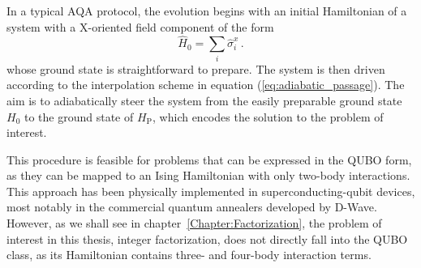In a typical AQA protocol, the evolution begins with an initial Hamiltonian of a system with a X-oriented field component of the form
\begin{equation}
    \hat{H}_0 = \sum_i \hat{\sigma}_i^x\,.
    \label{eq:transverse_field_hamiltonian}
\end{equation}
whose ground state is straightforward to prepare. The system is then driven according to the interpolation scheme in equation (\ref{eq:adiabatic_passage}). The aim is to adiabatically steer the system from the easily preparable ground state $H_0$ to the ground state of $H_\mathrm{P}$, which encodes the solution to the problem of interest.

This procedure is feasible for problems that can be expressed in the QUBO form, as they can be mapped to an Ising Hamiltonian with only two-body interactions. This approach has been physically implemented in superconducting-qubit devices, most notably in the commercial quantum annealers developed by D-Wave. However, as we shall see in chapter~\ref{Chapter:Factorization}, the problem of interest in this thesis, integer factorization, does not directly fall into the QUBO class, as its Hamiltonian contains three- and four-body interaction terms.